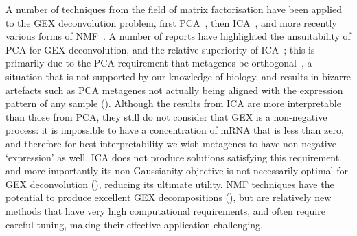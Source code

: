 \documentclass[dissertation.tex]{subfiles}
\begin{document}
A number of techniques from the field of matrix factorisation have been applied to the \gls{GEX} deconvolution problem, first \gls{PCA}~\cite{Alter2000}, then \gls{ICA}~\cite{Liebermeister2002}, and more recently various forms of \gls{NMF}~\cite{Brunet2004}.  A number of reports have highlighted the unsuitability of \gls{PCA} for \gls{GEX} deconvolution, and the relative superiority of \gls{ICA}~\cite{Lee2003, Saidi2004, Teschendorff2007}; this is primarily due to the \gls{PCA} requirement that metagenes be orthogonal~\cite{Lewicki2000}, a situation that is not supported by our knowledge of biology, and results in bizarre artefacts such as \gls{PCA} metagenes not actually being aligned with the expression pattern of any sample ().  Although the results from \gls{ICA} are more interpretable than those from \gls{PCA}, they still do not consider that \gls{GEX} is a non-negative process: it is impossible to have a concentration of mRNA that is less than zero, and therefore for best interpretability we wish metagenes to have non-negative `expression' as well.  \gls{ICA} does not produce solutions satisfying this requirement, and more importantly its non-Gaussianity objective is not necessarily optimal for \gls{GEX} deconvolution (), reducing its ultimate utility.  \gls{NMF} techniques have the potential to produce excellent \gls{GEX} decompositions (), but are relatively new methods that have very high computational requirements, and often require careful tuning, making their effective application challenging.
\end{document}
